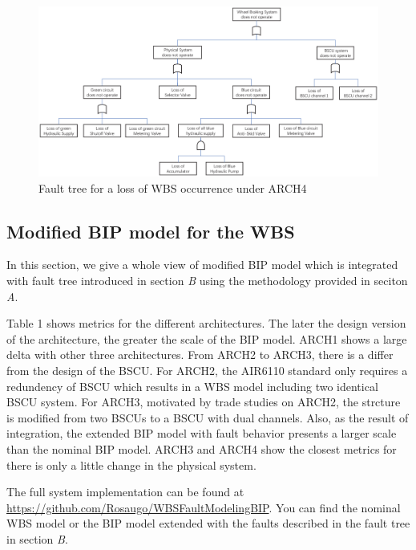 \documentclass[conference]{IEEEtran}
\begin{document}
\begin{figure}[htbp]
	\centerline{\includegraphics[width=165mm]{figure/fault_tree.eps}}
	\caption{Fault tree for a loss of WBS occurrence under ARCH4}
	\label{WBS_BIP_Nominal}
\end{figure}

\subsection{Modified BIP model for the WBS}
In this section, we give a whole view of modified BIP model which is integrated with fault tree introduced in section \emph{B} using the methodology provided in seciton \emph{A}.

Table 1 shows metrics for the different architectures. The later the design version of the architecture, the greater the scale of the BIP model. ARCH1 shows a large delta with other three architectures. From ARCH2 to ARCH3, there is a differ from the design of the BSCU. For ARCH2, the AIR6110 standard only requires a redundency of BSCU which results in a WBS model including two identical BSCU system. For ARCH3, motivated by trade studies on ARCH2, the strcture is modified from two BSCUs to a BSCU with dual channels. Also, as the result of integration, the extended BIP model with fault behavior presents a larger scale than the nominal BIP model. ARCH3 and ARCH4 show the closest metrics for there is only a little change in the physical system.

The full system implementation can be found at \href{https://github.com/Rosaugo/WBSFaultModelingBIP}{https://github.com/Rosaugo/WBSFaultModelingBIP}. You can find the nominal WBS model or the BIP model extended with the faults described in the fault tree in section \emph{B}.
\end{document}
